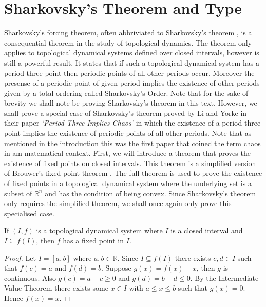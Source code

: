 \section{Sharkovsky's Theorem and Type}\label{sec:sharkovskys-theorem-and-type}
Sharkovsky's forcing theorem, often abbriviated to Sharkovsky's theorem \cite{sharkovsky}, is a consequential theorem in the study of topological dynamics. The theorem only applies to topological dynamical systems defined over closed intervals, however is still a powerful result. It states that if such a topological dynamical system has a period three point then periodic points of all other periods occur. Moreover the presense of a periodic point of given period implies the existence of other periods given by a total ordering called Sharkovsky's Order. Note that for the sake of brevity we shall note be proving Sharkovsky's theorem in this text. However, we shall prove a special case of Sharkovsky's theorem proved by Li and Yorke in their paper \emph{`Period Three Implies Chaos'} \cite{li-yorke} in which the existence of a period three point implies the existence of periodic points of all other periods. Note that as mentioned in the introduction this was the first paper that coined the term chaos in am matematical context. First, we will introduce a theorem that proves the existence of fixed points on closed intervals. This theorem is a simplified version of Brouwer's fixed-point theorem \cite{brouwer}. The full theorem is used to prove the existence of fixed points in a topological dynamical system where the underlying set is a subset of $\mathbb{R}^n$ and has the condition of being convex. Since Sharkovsky's theorem only requires the simplified theorem, we shall once again only prove this specialised case.

\begin{thm} \label{thm:interval-fixed-points}
    If $(I, f)$ is a topological dynamical system where $I$ is a closed interval and $I \subseteq f(I)$, then $f$ has a fixed point in $I$.
    \begin{proof}
        Let $I = [a, b]$ where $a, b \in \mathbb{R}$. Since $I \subseteq f(I)$ there exists $c, d \in I$ such that $f(c) = a$ and $f(d) = b$. Suppose $g(x) = f(x) - x$, then $g$ is continuous. Also $g(c) = a - c \geq 0$ and $g(d) = b - d \leq 0$. By the Intermediate Value Theorem there exists some $x \in I$ with $a \leq x \leq b$ such that $g(x) = 0$. Hence $f(x) = x$.
    \end{proof}
\end{thm}

